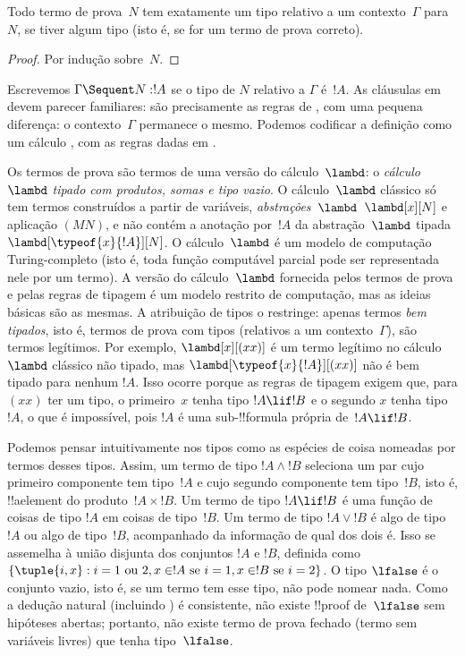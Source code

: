 \documentclass[../../../include/open-logic-section]{subfiles}
\begin{document}
\begin{prop}
Todo termo de prova~$N$ tem exatamente um tipo relativo a um
contexto~$\Gamma$ para~$N$, se tiver algum tipo (isto é, se for um termo
de prova correto).
\end{prop}

\begin{proof}
  Por indução sobre~$N$.
\end{proof}

Escrevemos $\Gamma \Sequent N : !A$ se o tipo de $N$ relativo a
$\Gamma$ é~$!A$. As cláusulas em  devem parecer
familiares: são precisamente as regras de , com uma pequena
diferença: o contexto~$\Gamma$ permanece o mesmo. Podemos codificar a
definição como um cálculo , com as regras dadas em
.



Os termos de prova são termos de uma versão do cálculo~$\lambd$: o
\emph{cálculo~$\lambd$ tipado com produtos, somas e tipo vazio}. O
cálculo~$\lambd$ clássico só tem termos construídos a partir de
variáveis, \emph{abstrações~$\lambd$}~$\lambd[x][N]$ e aplicação $(MN)$,
e não contém a anotação por~$!A$ da abstração~$\lambd$ tipada
$\lambd[\typeof{x}{!A}][N]$. O cálculo~$\lambd$ é um modelo de
computação Turing-completo (isto é, toda função computável parcial pode
ser representada nele por um termo). A versão do cálculo~$\lambd$
fornecida pelos termos de prova e pelas regras de tipagem é um modelo
restrito de computação, mas as ideias básicas são as mesmas. A atribuição
de tipos o restringe: apenas termos \emph{bem tipados}, isto é, termos
de prova com tipos (relativos a um contexto~$\Gamma$), são termos
legítimos. Por exemplo, $\lambd[x][(xx)]$ é um termo legítimo no
cálculo~$\lambd$ clássico não tipado, mas
$\lambd[\typeof{x}{!A}][(xx)]$ não é bem tipado para nenhum $!A$. Isso
ocorre porque as regras de tipagem exigem que, para $(xx)$ ter um tipo,
o primeiro~$x$ tenha tipo $!A \lif !B$ e o segundo $x$ tenha tipo~$!A$,
o que é impossível, pois $!A$ é uma sub-!!{formula} própria de~$!A \lif !B$.

Podemos pensar intuitivamente nos tipos como as espécies de coisa
nomeadas por termos desses tipos. Assim, um termo de tipo $!A \land !B$
seleciona um par cujo primeiro componente tem tipo~$!A$ e cujo segundo
componente tem tipo~$!B$, isto é, !!a{element} do produto~$!A \times !B$.
Um termo de tipo $!A \lif !B$ é uma função de coisas de tipo $!A$ em
coisas de tipo~$!B$. Um termo de tipo $!A \lor !B$ é algo de tipo $!A$
ou algo de tipo~$!B$, acompanhado da informação de qual dos dois é. Isso
se assemelha à união disjunta dos conjuntos $!A$ e $!B$, definida como
$\{\tuple{i,x} : i = 1 \text{ ou } 2, x \in !A \text{ se } i = 1,
x \in !B \text{ se } i=2\}$. O tipo $\lfalse$ é o conjunto vazio, isto
é, se um termo tem esse tipo, não pode nomear nada. Como a dedução
natural (incluindo ) é consistente, não existe !!{proof}
de~$\lfalse$ sem hipóteses abertas; portanto, não existe termo de prova
fechado (termo sem variáveis livres) que tenha tipo~$\lfalse$.
\end{document}
